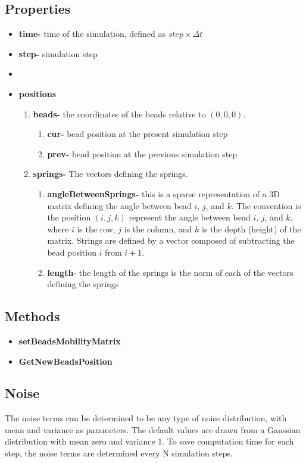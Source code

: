 \documentclass[12pt]{report}
\begin{document}
\subsection{Properties}
\begin{itemize}
\item{\textbf{time-}} time of the simulation, defined as $step\times\Delta t$
\item{\textbf{step-}} simulation step
\item{\textbf{}}
\item{\textbf{positions}}
\begin{enumerate}
\item{\textbf{beads-}} the coordinates of the beads relative to $(0,0,0)$.
\begin{enumerate}
\item{\textbf{cur-}} bead position at the present simulation step 
\item{\textbf{prev-}} bead position at the previous simulation step
\end{enumerate}
\item{\textbf{springs-}} The vectors defining the springs.
\begin{enumerate}
\item{\textbf{angleBetweenSprings-}} this is a sparse representation of a 3D matrix defining the angle between bead $i$, $j$, and $k$. The convention is the position $(i,j,k)$ represent the angle between bead $i$, $j$, and $k$, where $i$ is the row, $j$ is the column, and $k$ is the depth (height) of the matrix. Strings are defined by a vector composed of subtracting the bead position $i$ from $i+1$.
\item{\textbf{length}}- the length of the springs is the norm of each of the vectors defining the springs
\end{enumerate}


\end{enumerate}
\end{itemize}

\subsection{Methods}
\begin{itemize}
\item{\textbf{setBeadsMobilityMatrix}}
\item{\textbf{GetNewBeadsPosition}}
\end{itemize}

\subsection{Noise} 
The noise terms can be determined to be any type of noise distribution, with mean and variance as parameters. The default values are drawn from a Gaussian distribution with mean zero and variance 1. 
To save computation time for each step, the noise terms are determined every N simulation steps. 
 
\end{document}
